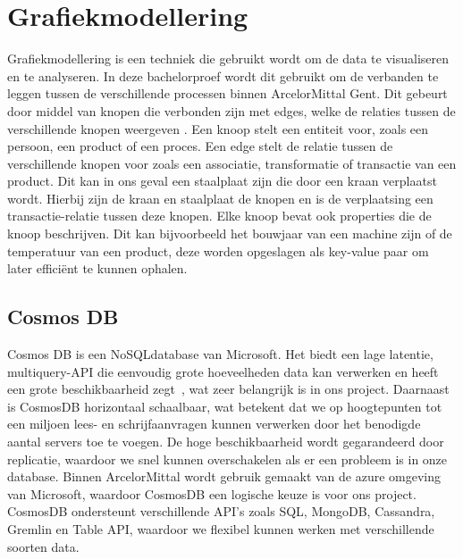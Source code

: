 \label{sec:grafiekmodellering}
\section{Grafiekmodellering}
Grafiekmodellering is een techniek die gebruikt wordt om de data te visualiseren en te analyseren. In deze bachelorproef wordt dit gebruikt om de verbanden te leggen tussen de verschillende processen binnen ArcelorMittal Gent.
Dit gebeurt door middel van knopen die verbonden zijn met edges, welke de relaties tussen de verschillende knopen weergeven \autocite{neo4j2025}.
Een knoop stelt een entiteit voor, zoals een persoon, een product of een proces. Een edge stelt de relatie tussen de verschillende knopen voor zoals een associatie, transformatie of transactie van een product.
Dit kan in ons geval een staalplaat zijn die door een kraan verplaatst wordt. Hierbij zijn de kraan en staalplaat de knopen en is de verplaatsing een transactie-relatie tussen deze knopen.
Elke knoop bevat ook properties die de knoop beschrijven. Dit kan bijvoorbeeld het bouwjaar van een machine zijn of de temperatuur van een product, deze worden opgeslagen als key-value paar om later efficiënt te kunnen ophalen.

\subsection{Cosmos DB}%
Cosmos DB is een NoSQL\-database van Microsoft. Het biedt een lage latentie, multi\-query-API die eenvoudig grote hoeveelheden data kan verwerken en heeft een grote beschikbaarheid zegt~\textcite{Put2020}, wat zeer belangrijk is in ons project.
Daarnaast is CosmosDB horizontaal schaalbaar, wat betekent dat we op hoogtepunten tot een miljoen lees- en schrijfaanvragen kunnen verwerken door het benodigde aantal servers toe te voegen.
De hoge beschikbaarheid wordt gegarandeerd door replicatie, waardoor we snel kunnen overschakelen als er een probleem is in onze database.
Binnen ArcelorMittal wordt gebruik gemaakt van de azure omgeving van Microsoft, waardoor CosmosDB een logische keuze is voor ons project.
CosmosDB ondersteunt verschillende API's zoals SQL, MongoDB, Cassandra, Gremlin en Table API, waardoor we flexibel kunnen werken met verschillende soorten data.

